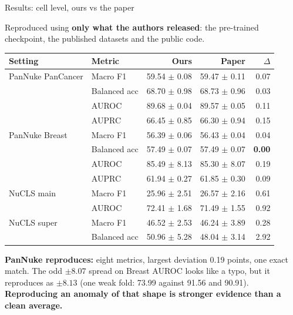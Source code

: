 \documentclass[aspectratio=169,11pt]{beamer}
\newcommand{\hl}[1]{\textcolor{haem}{\textbf{#1}}}
\begin{document}
\begin{frame}{Results: cell level, ours vs the paper}

  {\scriptsize Reproduced using \textbf{only what the authors released}: the
  pre-trained checkpoint, the published datasets and the public code.}
  \begin{center}\scriptsize
  \begin{tabular}{@{}llrrr@{}}
    \toprule
    \textbf{Setting} & \textbf{Metric} & \textbf{Ours} & \textbf{Paper} & \textbf{$\Delta$} \\
    \midrule
    PanNuke PanCancer & Macro F1      & 59.54 $\pm$ 0.08 & 59.47 $\pm$ 0.11 & 0.07 \\
                      & Balanced acc  & 68.70 $\pm$ 0.98 & 68.73 $\pm$ 0.96 & 0.03 \\
                      & AUROC         & 89.68 $\pm$ 0.04 & 89.57 $\pm$ 0.05 & 0.11 \\
                      & AUPRC         & 66.45 $\pm$ 0.85 & 66.30 $\pm$ 0.94 & 0.15 \\
    PanNuke Breast    & Macro F1      & 56.39 $\pm$ 0.06 & 56.43 $\pm$ 0.04 & 0.04 \\
                      & Balanced acc  & 57.49 $\pm$ 0.07 & 57.49 $\pm$ 0.07 & \textcolor{goodgreen}{\textbf{0.00}} \\
                      & AUROC         & 85.49 $\pm$ 8.13 & 85.30 $\pm$ 8.07 & 0.19 \\
                      & AUPRC         & 61.94 $\pm$ 0.27 & 61.85 $\pm$ 0.30 & 0.09 \\
    NuCLS main        & Macro F1      & 25.96 $\pm$ 2.51 & 26.57 $\pm$ 2.16 & 0.61 \\
                      & AUROC         & 72.41 $\pm$ 1.68 & 71.49 $\pm$ 1.55 & 0.92 \\
    NuCLS super       & Macro F1      & 46.52 $\pm$ 2.53 & 46.24 $\pm$ 3.89 & 0.28 \\
                      & Balanced acc  & 50.96 $\pm$ 5.28 & 48.04 $\pm$ 3.14 & 2.92 \\
    \bottomrule
  \end{tabular}
  \end{center}

  {\scriptsize
  \hl{PanNuke reproduces:} eight metrics, largest deviation 0.19 points, one exact
  match. The odd $\pm 8.07$ spread on Breast AUROC looks like a typo, but it
  reproduces as $\pm 8.13$ (one weak fold: 73.99 against 91.56 and 90.91).
  \textbf{Reproducing an anomaly of that shape is stronger evidence than a clean
  average.}}

\end{frame}
\end{document}
